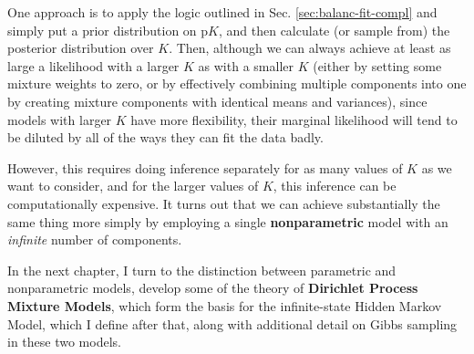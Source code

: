 One approach is to apply the logic outlined in
Sec. \ref{sec:balanc-fit-compl} and simply put a prior distribution on
p$K$, and then calculate (or sample from) the posterior distribution
over $K$.  Then, although we can always achieve at least as large a
likelihood with a larger $K$ as with a smaller $K$ (either by setting
some mixture weights to zero, or by effectively combining multiple
components into one by creating mixture components with
identical means and variances), since models with larger $K$ have more flexibility, their
marginal likelihood will tend to be diluted by all of the ways they can fit
the data badly.

However, this requires doing inference separately for as many values
of $K$ as we want to consider, and for the larger values of $K$, this
inference can be computationally expensive.  It turns out that we can
achieve substantially the same thing more simply by employing a single
{\bf nonparametric} model with an {\em infinite} number of
components.  

In the next chapter, I turn to the distinction between parametric and
nonparametric models, develop some of the theory of {\bf Dirichlet Process Mixture
  Models}, which form the basis for the infinite-state Hidden Markov
Model, which I define after that, along with additional detail on
Gibbs sampling in these two models.

